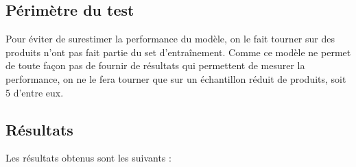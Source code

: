             \subsection{Périmètre du test}
            
            Pour éviter de surestimer la performance du modèle, on le fait tourner sur des produits n'ont pas fait partie du set d'entraînement.            
            Comme ce modèle ne permet de toute façon pas de fournir de résultats qui permettent de mesurer la performance, on ne le fera tourner que sur un échantillon réduit de produits, soit 5 d'entre eux.

            \subsection{Résultats}

            Les résultats obtenus sont les suivants :


